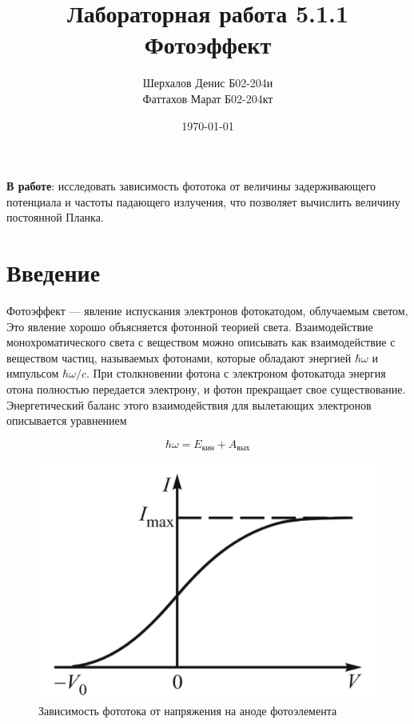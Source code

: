 \documentclass[a4paper,12pt]{article}
\author{Шерхалов Денис Б02-204и \\
		Фаттахов Марат Б02-204кт}
\title{Лабораторная работа 5.1.1 \\
	\textbf{Фотоэффект}}
\date{\today}
\theoremstyle{definition}
\begin{document}
	
{\Large \maketitle}

\textbf{В работе}: исследовать зависимость фототока от величины задерживающего потенциала и частоты падающего излучения, что позволяет вычислить величину постоянной Планка.

\section{Введение}

    Фотоэффект --- явление испускания электронов фотокатодом, облучаемым светом,  Это явление хорошо объясняется фотонной теорией света. Взаимодействие монохроматического света с веществом можно описывать
	как взаимодействие с веществом частиц, называемых фотонами, которые обладают энергией $ \hbar \omega $ и импульсом $ \hbar\omega/c $. При столкновении фотона с электроном фотокатода энергия отона полностью передается электрону, и фотон прекращает свое существование. Энергетический баланс этого взаимодействия для вылетающих электронов
	описывается уравнением
	
	\begin{equation}\label{energy balance}
	\hbar \omega = E_{\text{кин}} + A_{\text{вых}}
	\end{equation}
	
	\begin{figure}
		\includegraphics[width=\linewidth]{I_V.png}
		\caption{Зависимость фототока от напряжения на аноде фотоэлемента}
		\label{ris I(V)}
	\end{figure}
	
\end{document}
